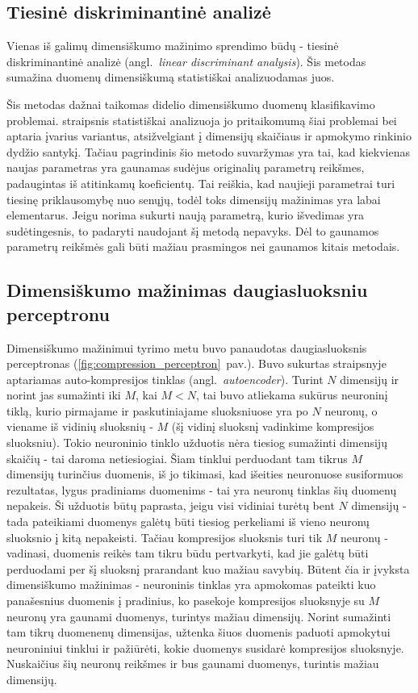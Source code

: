 \documentclass{VUMIFPSbakalaurinis}
\begin{document}
\subsection{Tiesinė diskriminantinė analizė}

Vienas iš galimų dimensiškumo mažinimo sprendimo būdų - tiesinė diskriminantinė analizė (angl.~\textit{linear discriminant analysis}).
Šis metodas sumažina duomenų dimensiškumą statistiškai analizuodamas juos.

Šis metodas dažnai taikomas didelio dimensiškumo duomenų klasifikavimo problemai.
\cite[289~psl.]{price-dimensionality-reduction} straipsnis statistiškai analizuoja jo pritaikomumą šiai problemai bei aptaria įvarius variantus, atsižvelgiant į dimensijų skaičiaus ir apmokymo rinkinio dydžio santykį.
Tačiau pagrindinis šio metodo suvaržymas yra tai, kad kiekvienas naujas parametras yra gaunamas sudėjus originalių parametrų reikšmes, padaugintas iš atitinkamų koeficientų.
Tai reiškia, kad naujieji parametrai turi tiesinę priklausomybę nuo senųjų, todėl toks dimensijų mažinimas yra labai elementarus.
Jeigu norima sukurti naują parametrą, kurio išvedimas yra sudėtingesnis, to padaryti naudojant šį metodą nepavyks.
Dėl to gaunamos parametrų reikšmės gali būti mažiau prasmingos nei gaunamos kitais metodais.



\subsection{Dimensiškumo mažinimas daugiasluoksniu perceptronu} \label{dimensionality-reduction-perceptron}

Dimensiškumo mažinimui tyrimo metu buvo panaudotas daugiasluoksnis perceptronas (\ref{fig:compression_perceptron}~pav.).
Buvo sukurtas \cite{autoencoder} straipsnyje aptariamas auto-kompresijos tinklas (angl.~\textit{autoencoder}).
Turint $N$ dimensijų ir norint jas sumažinti iki $M$, kai $M < N$, tai buvo atliekama sukūrus neuroninį tiklą, kurio pirmajame ir paskutiniajame sluoksniuose yra po $N$ neuronų, o viename iš vidinių sluoksnių - $M$ (šį vidinį sluoksnį vadinkime kompresijos sluoksniu).
Tokio neuroninio tinklo užduotis nėra tiesiog sumažinti dimensijų skaičių - tai daroma netiesiogiai.
Šiam tinklui perduodant tam tikrus $M$ dimensijų turinčius duomenis, iš jo tikimasi, kad išeities neuronuose susiformuos rezultatas, lygus pradiniams duomenims - tai yra neuronų tinklas šių duomenų nepakeis.
Ši užduotis būtų paprasta, jeigu visi vidiniai turėtų bent $N$ dimensijų - tada pateikiami duomenys galėtų būti tiesiog perkeliami iš vieno neuronų sluoksnio į kitą nepakeisti.
Tačiau kompresijos sluoksnis turi tik $M$ neuronų - vadinasi, duomenis reikės tam tikru būdu pertvarkyti, kad jie galėtų būti perduodami per šį sluoksnį prarandant kuo mažiau savybių.
Būtent čia ir įvyksta dimensiškumo mažinimas - neuroninis tinklas yra apmokomas pateikti kuo panašesnius duomenis į pradinius, ko pasekoje kompresijos sluoksnyje su $M$ neuronų yra gaunami duomenys, turintys mažiau dimensijų.
Norint sumažinti tam tikrų duomenenų dimensijas, užtenka šiuos duomenis paduoti apmokytui neuroniniui tinklui ir pažiūrėti, kokie duomenys susidarė kompresijos sluoksnyje.
Nuskaičius šių neuronų reikšmes ir bus gaunami duomenys, turintis mažiau dimensijų.
\end{document}
